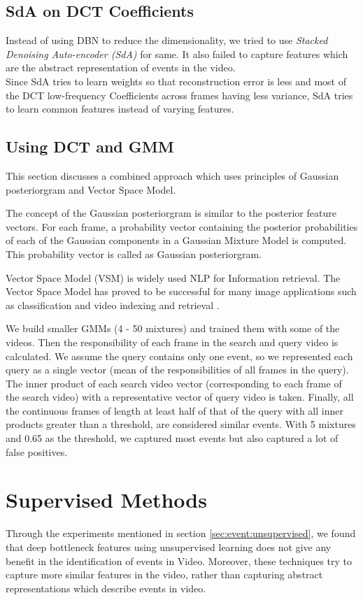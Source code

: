 \subsection{SdA on DCT Coefficients}
Instead of using DBN to reduce the dimensionality, we tried to use \textit{Stacked Denoising Auto-encoder (SdA)} for same. It also failed to capture features which are the abstract representation of events in the video.\\
Since SdA tries to learn weights so that reconstruction error is less and most of the DCT low-frequency Coefficients across frames having less variance, SdA tries to learn common features instead of varying features.\\

\subsection{Using DCT and GMM}
\label{sec:event:dct_gmm}
This section discusses a combined approach which uses principles of Gaussian posteriorgram and Vector Space Model.

The concept of the Gaussian posteriorgram is similar to the posterior feature vectors\citep{zhang2010towards}. For each frame, a probability vector containing the posterior probabilities of each of the Gaussian components in a Gaussian Mixture Model is computed. This probability vector is called as  Gaussian posteriorgram. 

Vector Space Model (VSM) is widely used NLP for Information retrieval. The Vector Space Model has proved to be successful for many image applications such as classification and video indexing and retrieval \citep{galmar2007analysis}. 

We build smaller GMMs (4 - 50 mixtures) and trained them with some of the videos. Then the responsibility of each frame in the search and query video is calculated. We assume the query contains only one event, so we represented each query as a single vector (mean of the responsibilities of all frames in the query). The inner product of each search video vector (corresponding to each frame of the search video) with a representative vector of query video is taken. Finally, all the continuous frames of length at least half of that of the query with all inner products greater than a threshold, are considered similar events. With 5 mixtures and 0.65 as the threshold, we captured most events but also captured a lot of false positives.

\section{Supervised Methods}
\label{sec:event:supervised}
Through the experiments mentioned in section  \ref{sec:event:unsupervised}, we found that deep bottleneck features using unsupervised learning does not give any benefit in the identification of events in Video. Moreover, these techniques try to capture more similar features in the video, rather than capturing abstract representations which describe events in video.

